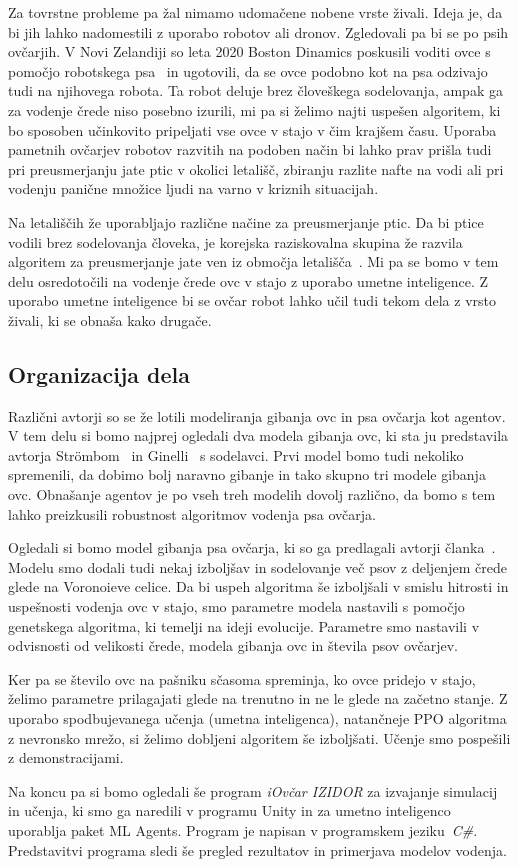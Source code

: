 Za tovrstne probleme pa žal nimamo udomačene nobene vrste živali. Ideja je, da bi jih lahko nadomestili z uporabo robotov ali dronov. Zgledovali pa bi se po psih ovčarjih. V Novi Zelandiji so leta 2020 Boston Dinamics poskusili voditi ovce s pomočjo robotskega psa~\cite{robot-sheperd} in ugotovili, da se ovce podobno kot na psa odzivajo tudi na njihovega robota. Ta robot deluje brez človeškega sodelovanja, ampak ga za vodenje črede niso posebno izurili, mi pa si želimo najti uspešen algoritem, ki bo sposoben učinkovito pripeljati vse ovce v stajo v čim krajšem času. Uporaba pametnih ovčarjev robotov razvitih na podoben način bi lahko prav prišla tudi pri preusmerjanju jate ptic v okolici letališč, zbiranju razlite nafte na vodi ali pri vodenju panične množice ljudi na varno v kriznih situacijah.

Na letališčih že uporabljajo različne načine za preusmerjanje ptic. Da bi ptice vodili brez sodelovanja človeka, je korejska raziskovalna skupina že razvila algoritem za preusmerjanje jate ven iz območja letališča~\cite{bird-herd, letalske-chung, letalske-chung2}. Mi pa se bomo v tem delu osredotočili na vodenje črede ovc v stajo z uporabo umetne inteligence. Z uporabo umetne inteligence bi se ovčar robot lahko učil tudi tekom dela z vrsto živali, ki se obnaša kako drugače.

\subsection{Organizacija dela}

Različni avtorji so se že lotili modeliranja gibanja ovc in psa ovčarja kot agentov. V tem delu si bomo najprej ogledali dva modela gibanja ovc, ki sta ju predstavila avtorja Str{\"o}mbom~\cite{Stroembom} in Ginelli~\cite{Ginelli} s sodelavci. Prvi model bomo tudi nekoliko spremenili, da dobimo bolj naravno gibanje in tako skupno tri modele gibanja ovc. Obnašanje agentov je po vseh treh modelih dovolj različno, da bomo s tem lahko preizkusili robustnost algoritmov vodenja psa ovčarja.

Ogledali si bomo model gibanja psa ovčarja, ki so ga predlagali avtorji članka~\cite{Stroembom}. Modelu smo dodali tudi nekaj izboljšav in sodelovanje več psov z deljenjem črede glede na Voronoieve celice. Da bi uspeh algoritma še izboljšali v smislu hitrosti in uspešnosti vodenja ovc v stajo, smo parametre modela nastavili s pomočjo genetskega algoritma, ki temelji na ideji evolucije. Parametre smo nastavili v odvisnosti od velikosti črede, modela gibanja ovc in števila psov ovčarjev.

Ker pa se število ovc na pašniku sčasoma spreminja, ko ovce pridejo v stajo, želimo parametre prilagajati glede na trenutno in ne le glede na začetno stanje. Z uporabo spodbujevanega učenja (umetna inteligenca), natančneje PPO algoritma z nevronsko mrežo, si želimo dobljeni algoritem še izboljšati. Učenje smo pospešili z demonstracijami.

Na koncu pa si bomo ogledali še program \textit{iOvčar IZIDOR} za izvajanje simulacij in učenja, ki smo ga naredili v programu Unity in za umetno inteligenco uporablja paket ML Agents. Program je napisan v programskem jeziku~\textit{C\#}. Predstavitvi programa sledi še pregled rezultatov in primerjava modelov vodenja.
